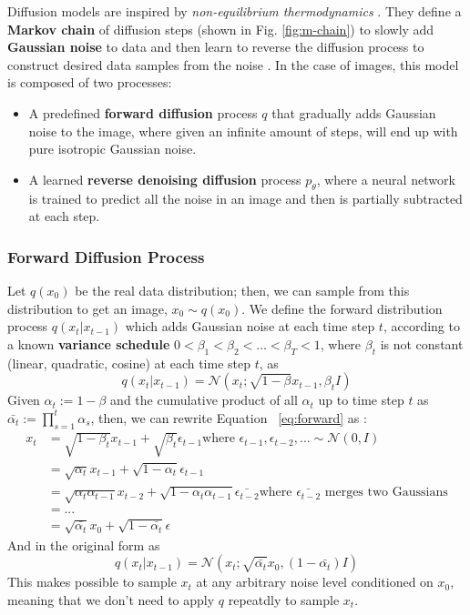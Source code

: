 \documentclass[preprint]{elsarticle}
\begin{document}
Diffusion models are inspired by \emph{non-equilibrium thermodynamics} \cite{V_n_2020}. 
They define a \textbf{Markov chain} of diffusion steps (shown in Fig. \ref{fig:m-chain}) to slowly 
add \textbf{Gaussian noise} to data and then learn to reverse the diffusion process to construct desired data samples from the noise \cite{weng2021diffusion}. 
In the case of images, this model is composed of two processes:
\begin{itemize}
	\item A predefined \textbf{forward diffusion} process $q$ that gradually adds Gaussian noise to the image, where given an infinite amount of steps, will end up with pure isotropic Gaussian noise. 
	\item A learned \textbf{reverse denoising diffusion} process $p_\theta$, where a neural network is trained to predict all the noise in an image and then is partially subtracted at each step.
\end{itemize}


\subsubsection{Forward Diffusion Process}
Let $q(x_0)$ be the real data distribution; then, we can sample from this distribution to get an image, $x_0 \sim q(x_0)$. 
We define the forward distribution process $q(x_t|x_{t-1})$ which adds Gaussian noise at each time step $t$, 
according to a known \textbf{variance schedule} $0<\beta_1<\beta_2<...<\beta_T<1$, where $\beta_t$ 
is not constant (linear, quadratic, cosine) at each time step $t$, 
as
\begin{equation} \label{eq:forward}
	q(x_t|x_{t-1}) = \mathcal{N}(x_t; \sqrt{1-\beta}x_{t-1}, \beta_t I)
\end{equation}
Given $\alpha_t:=1-\beta$ and the cumulative product of all $\alpha_t$ up to time step $t$ as 
$\bar{\alpha_t} := \prod_{s=1}^t\alpha_s$, then, we can rewrite Equation ~\ref{eq:forward} as 
\cite{weng2021diffusion}:
\begin{equation}
	\begin{split}
		x_t & = \sqrt{1-\beta_t}x_{t-1} + \sqrt{\beta_t}\epsilon_{t-1}
		\text{where $\epsilon_{t-1},\epsilon_{t-2},... \sim \mathcal{N}(0,I)$}\\
		& = \sqrt{\alpha_t}x_{t-1} + \sqrt{1-\alpha_t}\epsilon_{t-1} \\
		& = \sqrt{\alpha_t\alpha_{t-1}}x_{t-2} + \sqrt{1-\alpha_t\alpha_{t-1}}\bar{\epsilon_{t-2}} 
		\text{where $\bar{\epsilon_{t-2}}$ merges two Gaussians}\\
		& = ... \\
		& = \sqrt{\bar{\alpha_t}}x_0 + \sqrt{1-\bar{\alpha_t}}\epsilon 
	\end{split}
\end{equation}
And in the original form as
\begin{equation} \label{eq:forward2}
	q(x_t|x_{t-1}) = \mathcal{N}(x_t; \sqrt{\bar{\alpha_t}}x_0, (1 -\bar{\alpha_t}) I)
\end{equation}
This makes possible to sample $x_t$ at any arbitrary noise level conditioned on $x_0$,
meaning that we don't need to apply $q$ repeatdly to sample $x_t$.
\end{document}
